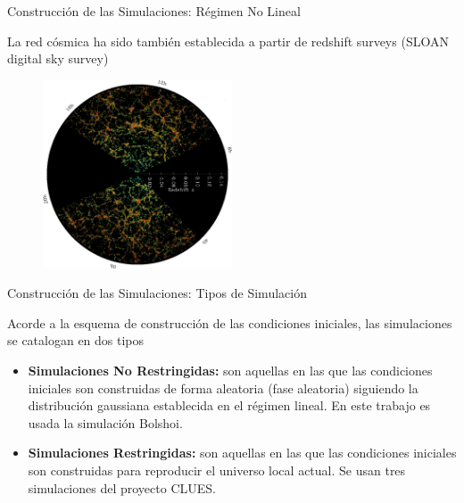 \documentclass[8pt,fleqn]{beamer}
\begin{document}
\begin{frame}
\begin{block}{Construcción de las Simulaciones: Régimen No Lineal}\justifying

La red cósmica ha sido también establecida a partir de redshift surveys
(SLOAN digital sky survey)

\begin{figure}[htbp]
	\centering
	\includegraphics[trim = 0mm 0mm 0mm 0mm, clip, width=0.5\textwidth]
	{./figures/SDSS.png}
\end{figure}
\end{block}
\end{frame}
\begin{frame}
\begin{block}{Construcción de las Simulaciones: Tipos de Simulación}\justifying

Acorde a la esquema de construcción de las condiciones iniciales, las 
simulaciones se catalogan en dos tipos

\begin{itemize}
\item \textbf{Simulaciones No Restringidas:} son aquellas en las que las 
condiciones iniciales son construidas de forma aleatoria (fase aleatoria) 
siguiendo la distribución gaussiana establecida en el régimen lineal.
En este trabajo es usada la simulación Bolshoi.
\item \textbf{Simulaciones Restringidas:} son aquellas en las que las 
condiciones iniciales son construidas para reproducir el universo local
actual. Se usan tres simulaciones del proyecto CLUES.
\end{itemize}

\end{block}
\end{frame}
\end{document}
